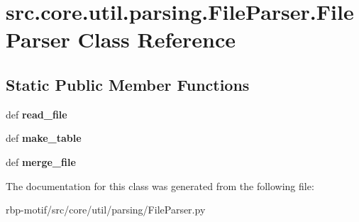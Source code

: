 \hypertarget{classsrc_1_1core_1_1util_1_1parsing_1_1FileParser_1_1FileParser}{\section{src.\-core.\-util.\-parsing.\-File\-Parser.\-File\-Parser Class Reference}
\label{classsrc_1_1core_1_1util_1_1parsing_1_1FileParser_1_1FileParser}
}
\subsection*{Static Public Member Functions}
\begin{DoxyCompactItemize}
\item 
\hypertarget{classsrc_1_1core_1_1util_1_1parsing_1_1FileParser_1_1FileParser_a083431cc05609eaeb06884c263e52438}{def {\bfseries read\-\_\-file}}\label{classsrc_1_1core_1_1util_1_1parsing_1_1FileParser_1_1FileParser_a083431cc05609eaeb06884c263e52438}

\item 
\hypertarget{classsrc_1_1core_1_1util_1_1parsing_1_1FileParser_1_1FileParser_ab260d5d8898863708d94c8c8cfad23f7}{def {\bfseries make\-\_\-table}}\label{classsrc_1_1core_1_1util_1_1parsing_1_1FileParser_1_1FileParser_ab260d5d8898863708d94c8c8cfad23f7}

\item 
\hypertarget{classsrc_1_1core_1_1util_1_1parsing_1_1FileParser_1_1FileParser_aee319cc277e01692cc6095180021ab1b}{def {\bfseries merge\-\_\-file}}\label{classsrc_1_1core_1_1util_1_1parsing_1_1FileParser_1_1FileParser_aee319cc277e01692cc6095180021ab1b}

\end{DoxyCompactItemize}


The documentation for this class was generated from the following file\-:\begin{DoxyCompactItemize}
\item 
rbp-\/motif/src/core/util/parsing/File\-Parser.\-py\end{DoxyCompactItemize}
